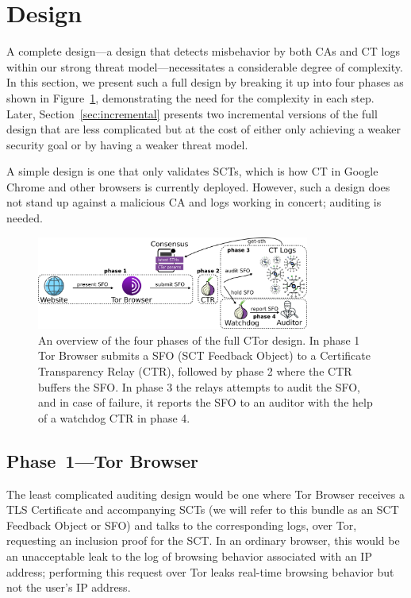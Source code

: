 \section{Design} \label{sec:base}

A complete design---a design that detects misbehavior by both CAs and CT logs
within our strong threat model---necessitates a considerable degree of
complexity. In this section, we present such a full design by breaking it up
into four phases as shown in Figure~\ref{fig:design}, demonstrating the need for
the complexity in each step. Later, Section~\ref{sec:incremental} presents two
incremental versions of the full design that are less complicated but at the
cost of either only achieving a weaker security goal or by having a weaker
threat model.

A simple design is one that only validates SCTs, which is how CT in Google
Chrome and other browsers is currently deployed. However, such a design does not
stand up against a malicious CA and logs working in concert; auditing is needed.

\begin{figure}
    \centering
	\includegraphics[width=0.8\textwidth]{img/design}
	\vspace{-8px}
	\caption{%
		An overview of the four phases of the full CTor design. In phase 1 Tor
	Browser submits a SFO (SCT Feedback Object) to a Certificate Transparency
	Relay (CTR), followed by phase 2 where the CTR buffers the SFO. In phase 3
	the relays attempts to audit the SFO, and in case of failure, it reports the
	SFO to an auditor with the help of a watchdog CTR in phase 4.}
	\label{fig:design}
	\vspace{-10px}
\end{figure}

\subsection{Phase~1---Tor Browser} \label{sec:base:phase1}

The least complicated auditing design would be one where Tor Browser receives a
TLS Certificate and accompanying SCTs (we will refer to this bundle as an SCT
Feedback Object or SFO) and talks to the corresponding logs, over Tor,
requesting an inclusion proof for the SCT. In an ordinary browser, this would be
an unacceptable leak to the log of browsing behavior associated with an IP
address; performing this request over Tor leaks real-time browsing behavior but
not the user's IP address.

